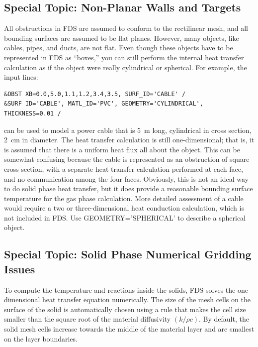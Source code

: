 \documentclass[11pt]{book}
\begin{document}
\subsection{Special Topic: Non-Planar Walls and Targets}

\label{info:GEOMETRY}

All obstructions in FDS are assumed to conform to the rectilinear
mesh, and all bounding surfaces are assumed to be flat
planes. However, many objects, like cables, pipes, and ducts, are not
flat. Even though these objects have to be represented in FDS as
``boxes,'' you can still perform the internal heat transfer
calculation as if the object were really cylindrical or spherical. For
example, the input lines:
\begin{lstlisting}
&OBST XB=0.0,5.0,1.1,1.2,3.4,3.5, SURF_ID='CABLE' /
&SURF ID='CABLE', MATL_ID='PVC', GEOMETRY='CYLINDRICAL', THICKNESS=0.01 /
\end{lstlisting}
can be used to model a power cable that is 5~m long, cylindrical in
cross section, 2~cm in diameter. The heat transfer calculation is
still one-dimensional; that is, it is assumed that there is a uniform
heat flux all about the object. This can be somewhat confusing because
the cable is represented as an obstruction of square cross section,
with a separate heat transfer calculation performed at each face, and
no communication among the four faces. Obviously, this is not an ideal
way to do solid phase heat transfer, but it does provide a reasonable
bounding surface temperature for the gas phase calculation. More
detailed assessment of a cable would require a two or
three-dimensional heat conduction calculation, which is not included
in FDS. Use {\ct GEOMETRY='SPHERICAL'} to describe a spherical object.


\subsection{Special Topic: Solid Phase Numerical Gridding Issues}
\label{info:solid_phase_stability}

To compute the temperature and reactions inside the solids, FDS solves
the one-dimensional heat transfer equation numerically. The size of
the mesh cells on the surface of the solid is automatically chosen
using a rule that makes the cell size smaller than the square root of
the material diffusivity $(k/\rho c)$. By default, the solid mesh
cells increase towards the middle of the material layer and are smallest
on the layer boundaries.
\end{document}

